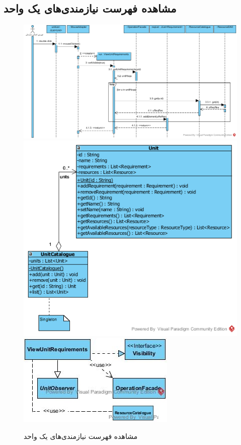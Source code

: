 \begin{landscape}
\section{مشاهده فهرست نیازمندی‌های یک واحد}
\begin{figure}[H]
	\centering
	\includegraphics[scale=0.8]{img/sequence-design/ViewListOfRequirements}
	\includegraphics[scale=0.7]{img/sequence-design/ViewListOfRequirementsC}
	\includegraphics[scale=0.7]{img/sequence-design/ViewListOfRequirementsUI}
	\caption{مشاهده فهرست نیازمندی‌های یک واحد}
\end{figure}


\end{landscape}

